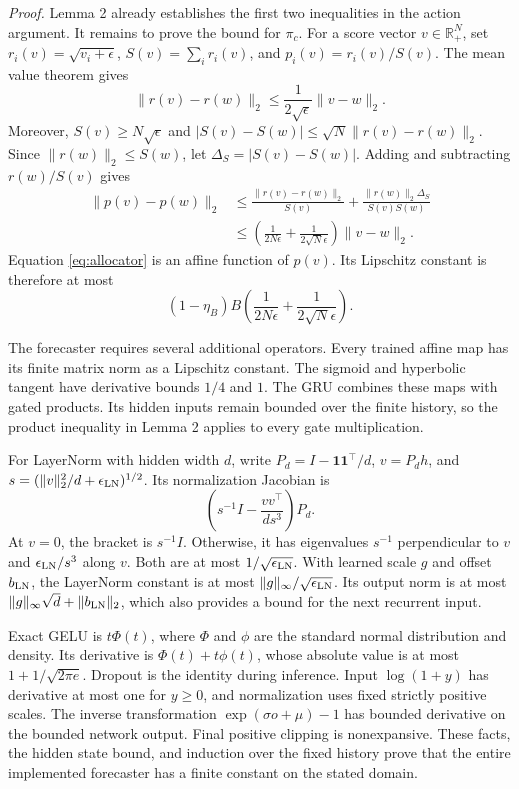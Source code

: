 \textit{Proof.}  Lemma 2 already establishes the first two inequalities in the
action argument.  It remains to prove the bound for $\pi_c$.  For a score vector
$v\in\mathbb R_+^N$, set $r_i(v)=\sqrt{v_i+\epsilon}$,
$S(v)=\sum_i r_i(v)$, and $p_i(v)=r_i(v)/S(v)$.  The mean value theorem gives
\begin{equation}
\|r(v)-r(w)\|_2\le\frac{1}{2\sqrt{\epsilon}}\|v-w\|_2.
\end{equation}
Moreover, $S(v)\ge N\sqrt{\epsilon}$ and
$|S(v)-S(w)|\le\sqrt N\|r(v)-r(w)\|_2$.  Since
$\|r(w)\|_2\le S(w)$, let $\Delta_S=|S(v)-S(w)|$.  Adding and subtracting
$r(w)/S(v)$ gives
\begin{align}
\|p(v)-p(w)\|_2
&\le \frac{\|r(v)-r(w)\|_2}{S(v)}
+\frac{\|r(w)\|_2\Delta_S}{S(v)S(w)} \nonumber\\
&\le\left(\frac{1}{2N\epsilon}
+\frac{1}{2\sqrt N\epsilon}\right)\|v-w\|_2.
\label{si:eq:allocator-lipschitz}
\end{align}
Equation \eqref{eq:allocator} is an affine function of $p(v)$.  Its Lipschitz
constant is therefore at most
\begin{equation}
(1-\eta_B)B
\left(\frac{1}{2N\epsilon}+\frac{1}{2\sqrt N\epsilon}\right).
\end{equation}

The forecaster requires several additional operators.  Every trained affine map
has its finite matrix norm as a Lipschitz constant.  The sigmoid and hyperbolic
tangent have derivative bounds $1/4$ and $1$.  The GRU combines these maps with
gated products.  Its hidden inputs remain bounded over the finite history, so
the product inequality in Lemma 2 applies to every gate multiplication.

For LayerNorm with hidden width $d$, write $P_d=I-\mathbf1\mathbf1^\top/d$,
$v=P_dh$, and $s=(\|v\|_2^2/d+\epsilon_{\rm LN})^{1/2}$.  Its normalization
Jacobian is
\begin{equation}
\left(s^{-1}I-\frac{vv^\top}{d s^3}\right)P_d.
\label{si:eq:layernorm-bound}
\end{equation}
At $v=0$, the bracket is $s^{-1}I$.  Otherwise, it has eigenvalues $s^{-1}$ perpendicular to $v$ and
$\epsilon_{\rm LN}/s^3$ along $v$.  Both are at most
$1/\sqrt{\epsilon_{\rm LN}}$.  With learned scale $g$ and offset $b_{\rm LN}$,
the LayerNorm constant is at most $\|g\|_\infty/\sqrt{\epsilon_{\rm LN}}$.
Its output norm is at most $\|g\|_\infty\sqrt d+\|b_{\rm LN}\|_2$, which also
provides a bound for the next recurrent input.

Exact GELU is $t\Phi(t)$, where $\Phi$ and $\phi$ are the standard normal
distribution and density.  Its derivative is $\Phi(t)+t\phi(t)$, whose absolute
value is at most $1+1/\sqrt{2\pi e}$.
Dropout is the identity during inference.  Input $\log(1+y)$ has derivative at
most one for $y\ge0$, and normalization uses fixed strictly positive scales.
The inverse transformation $\exp(\sigma o+\mu)-1$ has bounded derivative on the
bounded network output.  Final positive clipping is nonexpansive.  These facts,
the hidden state bound, and induction over the fixed history prove that the
entire implemented forecaster has a finite constant on the stated domain.

